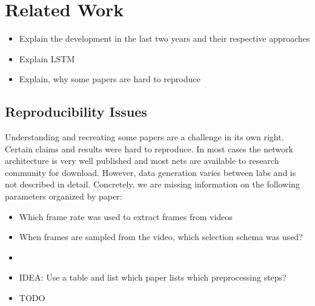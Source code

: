 \section{Related Work}
\label{sec:related}


\begin{itemize}
	\item Explain the development in the last two years and their respective approaches
    \item Explain LSTM
	\item Explain, why some papers are hard to reproduce
\end{itemize}

\subsection*{Reproducibility Issues}
Understanding and recreating some papers are a challenge in its own right. Certain claims and results were hard to reproduce. In most cases the network architecture is very well published and most nets are available to research community for download. However, data generation varies between labs and is not described in detail.
Concretely, we are missing information on the following parameters organized by paper:
\begin{itemize}
	\item Which frame rate was used to extract frames from videos
	\item When frames are sampled from the video, which selection schema was used?
	\item
	\item IDEA: Use a table and list which paper lists which preprocessing steps?
	\item TODO
\end{itemize}